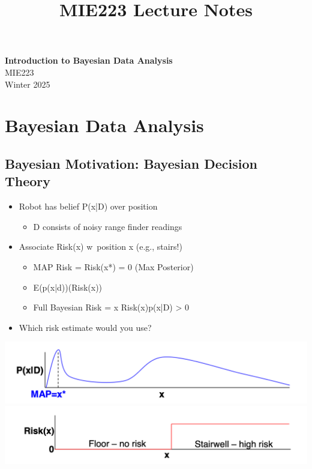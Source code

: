 \documentclass[11pt]{article}
\theoremstyle{definition}
\begin{document}
\setcounter{section}{0}
\title{MIE223 Lecture Notes}

\thispagestyle{empty}

\begin{center}
{\LARGE \bf Introduction to Bayesian Data Analysis}\\
{\large MIE223}\\
Winter 2025
\end{center}
\section{Bayesian Data Analysis}

\subsection{Bayesian Motivation: Bayesian Decision Theory}
\begin{itemize}
    \item Robot has belief P(x|D) over position
    \begin{itemize}
        \item D consists of noisy range finder readings
    \end{itemize}
    \item Associate Risk(x) w\ position x (e.g., stairs!)
    \begin{itemize}
        \item MAP Risk = Risk(x*) = 0 (Max Posterior)
        \item E(p(x|d))(Risk(x))
        \item Full Bayesian Risk = x Risk(x)p(x|D) > 0
    \end{itemize}
    \item Which risk estimate would you use?
\end{itemize}

\includegraphics[width=\textwidth]{1.png}
\includegraphics[width=\textwidth]{2.png}
\end{document}
